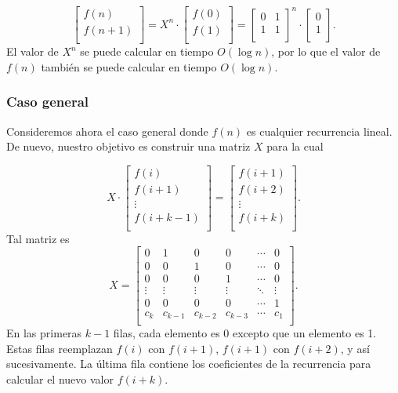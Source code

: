 \[
 \begin{bmatrix}
  f(n) \\
  f(n+1) \\
 \end{bmatrix}
=
X^n \cdot
 \begin{bmatrix}
  f(0) \\
  f(1) \\
 \end{bmatrix}
=
 \begin{bmatrix}
  0 & 1 \\
  1 & 1 \\
 \end{bmatrix}^n
\cdot
 \begin{bmatrix}
  0 \\
  1 \\
 \end{bmatrix}.
\]
El valor de $X^n$ se puede calcular en
tiempo $O(\log n)$,
por lo que el valor de $f(n)$ también se puede calcular
en tiempo $O(\log n)$.

\subsubsection{Caso general}
Consideremos ahora el caso general donde
$f(n)$ es cualquier recurrencia lineal.
De nuevo, nuestro objetivo es construir una matriz $X$
para la cual

\[ X \cdot
 \begin{bmatrix}
  f(i) \\
  f(i+1) \\
  \vdots \\
  f(i+k-1) \\
 \end{bmatrix}
=
 \begin{bmatrix}
  f(i+1) \\
  f(i+2) \\
  \vdots \\
  f(i+k) \\
 \end{bmatrix}.
\]
Tal matriz es
\[
X =
 \begin{bmatrix}
  0 & 1 & 0 & 0 & \cdots & 0 \\
  0 & 0 & 1 & 0 & \cdots & 0 \\
  0 & 0 & 0 & 1 & \cdots & 0 \\
  \vdots & \vdots & \vdots & \vdots & \ddots & \vdots \\
  0 & 0 & 0 & 0 & \cdots & 1 \\
  c_k & c_{k-1} & c_{k-2} & c_{k-3} & \cdots & c_1 \\
 \end{bmatrix}.
\]
En las primeras $k-1$ filas, cada elemento es 0
excepto que un elemento es 1.
Estas filas reemplazan $f(i)$ con $f(i+1)$,
$f(i+1)$ con $f(i+2)$, y así sucesivamente.
La última fila contiene los coeficientes de la recurrencia
para calcular el nuevo valor $f(i+k)$.

